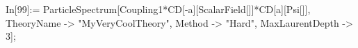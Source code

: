 In[99]:= ParticleSpectrum[Coupling1*CD[-a][ScalarField[]]*CD[a][Psi[]], TheoryName -> "MyVeryCoolTheory", Method -> "Hard", MaxLaurentDepth -> 3]; 